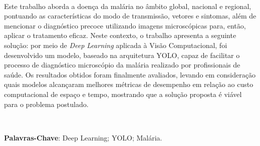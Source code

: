 \ \ \\[2cm]

\noindent Este trabalho aborda a doença da malária no âmbito global, nacional e regional, pontuando as características do modo de transmissão, vetores e sintomas, além de mencionar o diagnóstico precoce utilizando imagens microscópicas para, então, aplicar o tratamento eficaz. Neste contexto, o trabalho apresenta a seguinte solução: por meio de \emph{Deep Learning} aplicada à Visão Computacional, foi desenvolvido um modelo, baseado na arquitetura YOLO, capaz de facilitar o processo de diagnóstico microscópio da malária realizado por profissionais de saúde. Os resultados obtidos foram finalmente avaliados, levando em consideração quais modelos alcançaram melhores métricas de desempenho em relação ao custo computacional de espaço e tempo, mostrando que a solução proposta é viável para o problema postulado.

\ \ \newline

\noindent \textbf{Palavras-Chave}: Deep Learning; YOLO; Malária.
